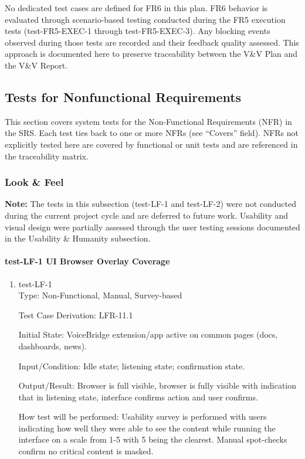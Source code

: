 \documentclass[12pt, titlepage]{article}
\begin{document}
No dedicated test cases are defined for FR6 in this plan. FR6 behavior is evaluated through scenario-based testing conducted during the FR5 execution tests (test-FR5-EXEC-1 through test-FR5-EXEC-3). Any blocking events observed during those tests are recorded and their feedback quality assessed. This approach is documented here to preserve traceability between the V\&V Plan and the V\&V Report.

\subsection{Tests for Nonfunctional Requirements}

This section covers system tests for the Non-Functional Requirements (NFR) in the SRS. Each test ties back to one or more NFRs (see “Covers” field). NFRs not explicitly tested here are covered by functional or unit tests and are referenced in the traceability matrix.

\subsubsection{Look \& Feel}

\noindent\textbf{Note:} The tests in this subsection (test-LF-1 and test-LF-2) were not conducted during the current project cycle and are deferred to future work. Usability and visual design were partially assessed through the user testing sessions documented in the Usability \& Humanity subsection.

\paragraph{test-LF-1 UI Browser Overlay Coverage}

\begin{enumerate}
\item{test-LF-1\\}
Type: Non-Functional, Manual, Survey-based

Test Case Derivation: LFR-11.1

Initial State: VoiceBridge extension/app active on common pages (docs, dashboards, news).

Input/Condition: Idle state; listening state; confirmation state.

Output/Result: Browser is full visible, browser is fully visible with indication that in listening state, interface confirms action and user confirms.

How test will be performed: Usability survey is performed with users indicating how well they were able to see the content while running the interface on a scale from 1-5 with 5 being the clearest. Manual spot-checks confirm no critical content is masked.
\end{enumerate}
\end{document}
